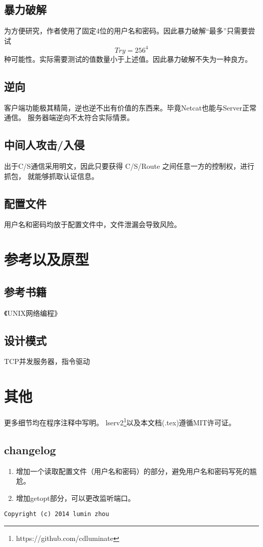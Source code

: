 \documentclass[a4paper,12pt]{article}
\begin{document}
\begin{CJK}{UTF8}{gbsn}
	\subsection{暴力破解}
		为方便研究，作者使用了固定4位的用户名和密码。因此暴力破解“最多”只需要尝试
		\begin{equation}
Try = 256^{4}
		\end{equation}
		种可能性。实际需要测试的值数量小于上述值。因此暴力破解不失为一种良方。
	\subsection{逆向}
		客户端功能极其精简，逆也逆不出有价值的东西来。毕竟Netcat也能与Server正常通信。
		服务器端逆向不太符合实际情景。
	\subsection{中间人攻击/入侵}
		出于C/S通信采用明文，因此只要获得 C/S/Route 之间任意一方的控制权，进行抓包，
		就能够抓取认证信息。
	\subsection{配置文件}
		用户名和密码均放于配置文件中，文件泄漏会导致风险。

\section{参考以及原型}
	\subsection{参考书籍}
		《UNIX网络编程》
	\subsection{设计模式}
		TCP并发服务器，指令驱动

\section{其他}
	更多细节均在程序注释中写明。
	lserv2\footnote{https://github.com/cdluminate}以及本文档(.tex)遵循MIT许可证。
	\subsection{changelog}
		\begin{enumerate}
		\item 增加一个读取配置文件（用户名和密码）的部分，避免用户名和密码写死的尴尬。
		\item 增加getopt部分，可以更改监听端口。
		\end{enumerate}

	\begin{verbatim}
Copyright (c) 2014 lumin zhou
	\end{verbatim} 


\end{CJK}
\end{document}
